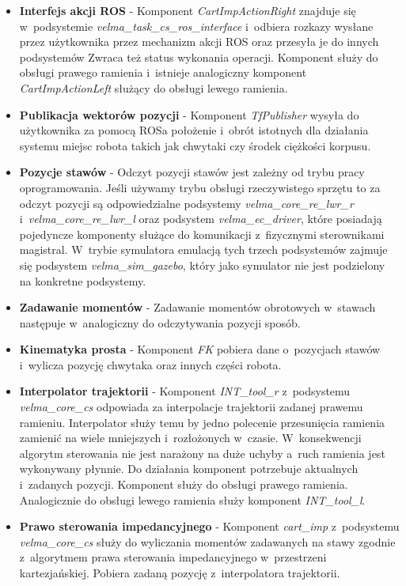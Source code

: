 \begin{itemize}
	\item \textbf{Interfejs akcji ROS} - 
	Komponent \textit{CartImpActionRight} znajduje się w~podsystemie \textit{velma\_task\_cs\_ros\_interface} i~odbiera rozkazy wysłane przez użytkownika przez mechanizm akcji ROS oraz przesyła je do innych podsystemów Zwraca też status wykonania operacji. Komponent służy do obsługi prawego ramienia i~istnieje analogiczny komponent \textit{CartImpActionLeft} służący do obsługi lewego ramienia.
	\item \textbf{Publikacja wektorów pozycji} - 
	Komponent \textit{TfPublisher} wysyła do użytkownika za pomocą ROSa położenie i~obrót istotnych dla działania systemu miejsc robota takich jak chwytaki czy środek ciężkości korpusu. 
	\item \textbf{Pozycje stawów} - 
	Odczyt pozycji stawów jest zależny od trybu pracy oprogramowania. Jeśli używamy trybu obsługi rzeczywistego sprzętu to za odczyt pozycji są odpowiedzialne podsystemy \textit{velma\_core\_re\_lwr\_r} i~\textit{velma\_core\_re\_lwr\_l} oraz podsystem \textit{velma\_ec\_driver}, które posiadają pojedyncze komponenty służące do komunikacji z~fizycznymi sterownikami magistral. W~trybie symulatora emulacją tych trzech podsystemów zajmuje się podsystem \textit{velma\_sim\_gazebo}, który jako symulator nie jest podzielony na konkretne podsystemy.
	\item \textbf{Zadawanie momentów} - 
	Zadawanie momentów obrotowych w~stawach następuje w~analogiczny do odczytywania pozycji sposób.
	\item \textbf{Kinematyka prosta} - 
	Komponent \textit{FK} pobiera dane o~pozycjach stawów i~wylicza pozycję chwytaka oraz innych części robota.
	\item \textbf{Interpolator trajektorii} - 
	Komponent \textit{INT\_tool\_r} z~podsystemu \textit{velma\_core\_cs} odpowiada za interpolacje trajektorii zadanej prawemu ramieniu. Interpolator służy temu by jedno polecenie przesunięcia ramienia zamienić na wiele mniejszych i~rozłożonych w~czasie. W~konsekwencji algorytm sterowania nie jest narażony na duże uchyby a~ruch ramienia jest wykonywany płynnie. Do działania komponent potrzebuje aktualnych i~zadanych pozycji. Komponent służy do obsługi prawego ramienia. Analogicznie do obsługi lewego ramienia służy komponent \textit{INT\_tool\_l}.
	
	\item \textbf{Prawo sterowania impedancyjnego} - 
	Komponent \textit{cart\_imp} z~podsystemu \textit{velma\_core\_cs} służy do wyliczania momentów zadawanych na stawy zgodnie z~algorytmem prawa sterowania impedancyjnego w~przestrzeni kartezjańskiej. Pobiera zadaną pozycję z~interpolatora trajektorii.
\end{itemize}

